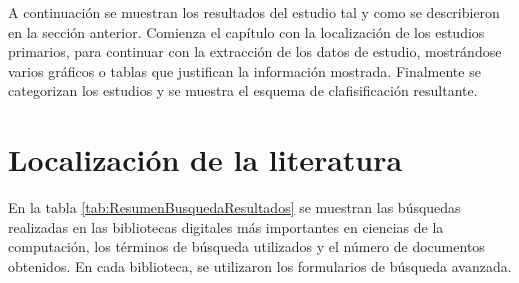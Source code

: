 


A continuación se muestran los resultados del estudio tal y como se describieron en la sección anterior. Comienza el capítulo con la localización de los estudios primarios, para continuar con la extracción de los datos de estudio, mostrándose varios gráficos o tablas que justifican la información mostrada. Finalmente se categorizan los estudios y se muestra el esquema de clafisificación resultante.

\section{Localización de la literatura}
En la tabla \ref{tab:ResumenBusquedaResultados} se muestran las búsquedas realizadas en las bibliotecas digitales más importantes en ciencias de la computación, los términos de búsqueda utilizados y el número de documentos obtenidos. En cada biblioteca, se utilizaron los formularios de búsqueda avanzada. 



